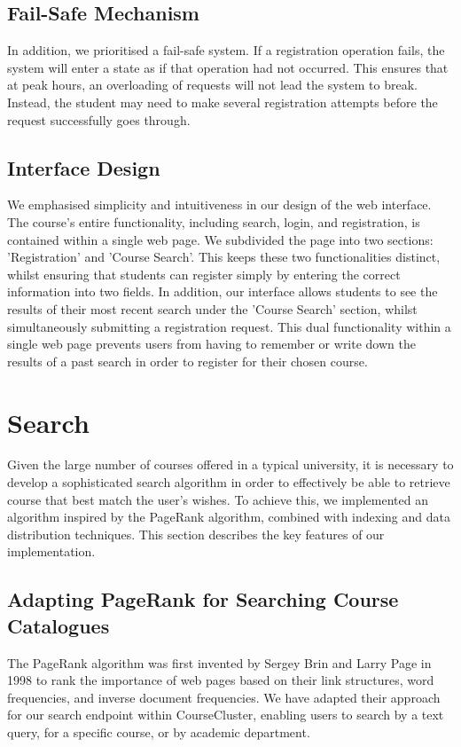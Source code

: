 \documentclass[sigplan, screen, 10pt]{acmart}
\begin{document}
\subsection{Fail-Safe Mechanism}
In addition, we prioritised a fail-safe system. If a registration operation fails, the system will enter a state as if that operation had not occurred. This ensures that at peak hours, an overloading of requests will not lead the system to break. Instead, the student may need to make several registration attempts before the request successfully goes through.

\subsection{Interface Design}
We emphasised simplicity and intuitiveness in our design of the web interface. The course's entire functionality, including search, login, and registration, is contained within a single web page. We subdivided the page into two sections: 'Registration' and 'Course Search'. This keeps these two functionalities distinct, whilst ensuring that students can register simply by entering the correct information into two fields. In addition, our interface allows students to see the results of their most recent search under the 'Course Search' section, whilst simultaneously submitting a registration request. This dual functionality within a single web page prevents users from having to remember or write down the results of a past search in order to register for their chosen course.

\section{Search}
Given the large number of courses offered in a typical university, it is necessary to develop a sophisticated search algorithm in order to effectively be able to retrieve course that best match the user's wishes. To achieve this, we implemented an algorithm inspired by the PageRank algorithm, combined with indexing and data distribution techniques. This section describes the key features of our implementation.

\subsection{Adapting PageRank for Searching Course Catalogues}
The PageRank algorithm was first invented by Sergey Brin and Larry Page in 1998 to rank the importance of web pages based on their link structures, word frequencies, and inverse document frequencies. We have adapted their approach for our search endpoint within CourseCluster, enabling users to search by a text query, for a specific course, or by academic department.
\end{document}
